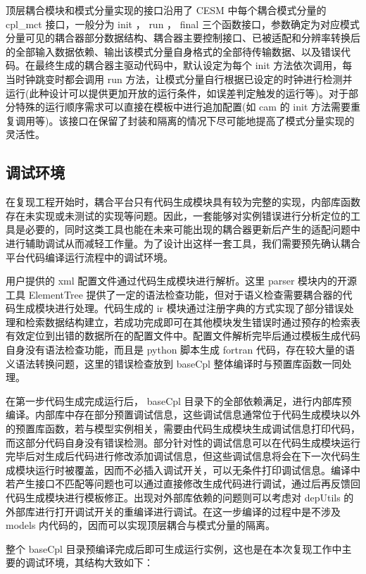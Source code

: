 顶层耦合模块和模式分量实现的接口沿用了 CESM 中每个耦合模式分量的 cpl\_mct 接口，一般分为 init ， run ， final 三个函数接口，参数确定为对应模式分量可见的耦合器部分数据结构、耦合器主要控制接口、已被适配和分辨率转换后的全部输入数据依赖、输出该模式分量自身格式的全部待传输数据、以及错误代码。在最终生成的耦合器主驱动代码中，默认设定为每个 init 方法依次调用，每当时钟跳变时都会调用 run 方法，让模式分量自行根据已设定的时钟进行检测并运行(此种设计可以提供更加开放的运行条件，如误差判定触发的运行等)。对于部分特殊的运行顺序需求可以直接在模板中进行追加配置(如 cam 的 init 方法需要重复调用等)。该接口在保留了封装和隔离的情况下尽可能地提高了模式分量实现的灵活性。

\subsection{调试环境}

在复现工程开始时，耦合平台只有代码生成模块具有较为完整的实现，内部库函数存在未实现或未测试的实现等问题。因此，一套能够对实例错误进行分析定位的工具是必要的，同时这类工具也能在未来可能出现的耦合器更新后产生的适配问题中进行辅助调试从而减轻工作量。为了设计出这样一套工具，我们需要预先确认耦合平台代码编译运行流程中的调试环境。

用户提供的 xml 配置文件通过代码生成模块进行解析。这里 parser 模块内的开源工具 ElementTree 提供了一定的语法检查功能，但对于语义检查需要耦合器的代码生成模块进行处理。代码生成的 ir 模块通过注册字典的方式实现了部分错误处理和检索数据结构建立，若成功完成即可在其他模块发生错误时通过预存的检索表有效定位到出错的数据所在的配置文件中。配置文件解析完毕后通过模板生成代码自身没有语法检查功能，而且是 python 脚本生成 fortran 代码，存在较大量的语义语法转换问题，这里的错误检查放到 baseCpl 整体编译时与预置库函数一同处理。

在第一步代码生成完成运行后， baseCpl 目录下的全部依赖满足，进行内部库预编译。内部库中存在部分预置调试信息，这些调试信息通常位于代码生成模块以外的预置库函数，若与模型实例相关，需要由代码生成模块生成调试信息打印代码，而这部分代码自身没有错误检测。部分针对性的调试信息可以在代码生成模块运行完毕后对生成后代码进行修改添加调试信息，但这些调试信息将会在下一次代码生成模块运行时被覆盖，因而不必插入调试开关，可以无条件打印调试信息。编译中若产生接口不匹配等问题也可以通过直接修改生成代码进行调试，通过后再反馈回代码生成模块进行模板修正。出现对外部库依赖的问题则可以考虑对 depUtils 的外部库进行打开调试开关的重编译进行调试。在这一步编译的过程中是不涉及 models 内代码的，因而可以实现顶层耦合与模式分量的隔离。

整个 baseCpl 目录预编译完成后即可生成运行实例，这也是在本次复现工作中主要的调试环境，其结构大致如下：

